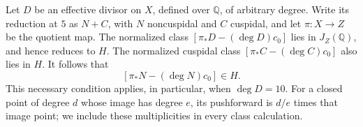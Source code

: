 Let $D$ be an effective divisor on $X$, defined over $\mathbb Q$,
of arbitrary degree. Write its reduction at $5$ as $N+C$, with
$N$ noncuspidal and $C$ cuspidal, and let $\pi:X\to Z$ be the
quotient map. The normalized class
$[\pi_*D-(\deg D)c_0]$ lies in $J_Z(\mathbb Q)$, and hence reduces
to $H$. The normalized cuspidal class
$[\pi_*C-(\deg C)c_0]$ also lies in $H$.
It follows that
\[
 [\pi_*N-(\deg N)c_0]\in H.
\]
This necessary condition applies, in particular, when $\deg D=10$.
For a closed point of degree $d$ whose image has degree $e$, its
pushforward is $d/e$ times that image point; we include these
multiplicities in every class calculation.
